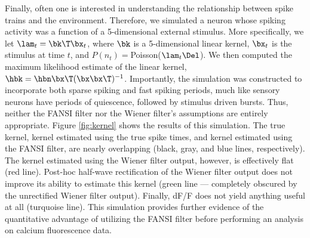 % 
% 
% 

Finally, often one is interested in understanding the relationship between spike trains and the environment.  Therefore, we simulated a neuron whose spiking activity was a function of a 5-dimensional external stimulus.  More specifically, we let $\lam_t = \bk\T \bx_t$, where $\bk$ is a 5-dimensional linear kernel, $\bx_t$ is the stimulus at time $t$, and $P(n_t)=$Poisson($\lam_t \Del$).  We then computed the maximum likelihood estimate of the linear kernel, $\hbk=\hbn \bx\T (\bx \bx\T)^{-1}$.  Importantly, the simulation was constructed to incorporate both sparse spiking and fast spiking periods, much like sensory neurons have periods of quiescence, followed by stimulus driven bursts.  Thus, neither the FANSI filter nor the Wiener filter's assumptions are entirely appropriate. Figure \ref{fig:kernel} shows the results of this simulation.  The true kernel, kernel estimated using the true spike times, and kernel estimated using the FANSI filter, are nearly overlapping (black, gray, and blue lines, respectively).  The kernel estimated using the Wiener filter output, however, is effectively flat (red line). Post-hoc half-wave rectification of the Wiener filter output does not improve its ability to estimate this kernel (green line --- completely obscured by the unrectified Wiener filter output).  Finally, dF/F does not yield anything useful at all (turquoise line).  This simulation provides further evidence of the quantitative advantage of utilizing the FANSI filter before performing an analysis on calcium fluorescence data.

